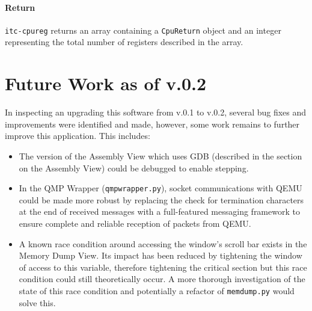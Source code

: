 \documentclass{article}
\newcommand{\code}[1]{\texttt{#1}}
\begin{document}
\paragraph{Return} \code{itc-cpureg} returns an array containing a \code{CpuReturn} object and an integer representing the total number of registers described in the array.
 
 
\section{Future Work as of v.0.2}

In inspecting an upgrading this software from v.0.1 to v.0.2, several bug fixes and improvements were identified and made, however, some work remains to further improve this application. This includes:

\begin{itemize}
    \item The version of the Assembly View which uses GDB (described in the section on the Assembly View) could be debugged to enable stepping.
    \item In the QMP Wrapper (\code{qmpwrapper.py}), socket communications with QEMU could be made more robust by replacing the check for termination characters at the end of received messages with a full-featured messaging framework to ensure complete and reliable reception of packets from QEMU.
    \item A known race condition around accessing the window's scroll bar exists in the Memory Dump View. Its impact has been reduced by tightening the window of access to this variable, therefore tightening the critical section but this race condition could still theoretically occur. A more thorough investigation of the state of this race condition and potentially a refactor of \code{memdump.py} would solve this.
\end{itemize} 
\end{document}
